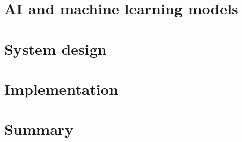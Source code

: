 \lipsum[15-16]

\section{AI and machine learning models}\label{sec:aiml}

\lipsum[17-18]

\section{System design}\label{sec:design}

\lipsum[19-20]

\section{Implementation}\label{sec:impl}

\lipsum[21-22]

\section{Summary}\label{sec:summary}

\lipsum[23-24]